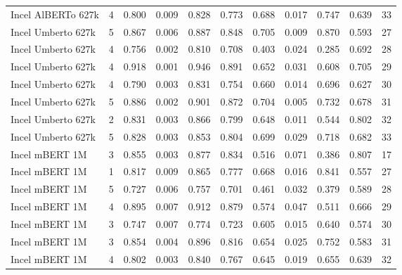 \begin{tabular}{lrrrrrrrrrr}
Incel AlBERTo 627k &      4 &   0.800 &          0.009 &    0.828 &     0.773 &    0.688 &           0.017 &     0.747 &      0.639 &  33 \\
Incel Umberto 627k &      5 &   0.867 &          0.006 &    0.887 &     0.848 &    0.705 &           0.009 &     0.870 &      0.593 &  27 \\
Incel Umberto 627k &      4 &   0.756 &          0.002 &    0.810 &     0.708 &    0.403 &           0.024 &     0.285 &      0.692 &  28 \\
Incel Umberto 627k &      4 &   0.918 &          0.001 &    0.946 &     0.891 &    0.652 &           0.031 &     0.608 &      0.705 &  29 \\
Incel Umberto 627k &      4 &   0.790 &          0.003 &    0.831 &     0.754 &    0.660 &           0.014 &     0.696 &      0.627 &  30 \\
Incel Umberto 627k &      5 &   0.886 &          0.002 &    0.901 &     0.872 &    0.704 &           0.005 &     0.732 &      0.678 &  31 \\
Incel Umberto 627k &      2 &   0.831 &          0.003 &    0.866 &     0.799 &    0.648 &           0.011 &     0.544 &      0.802 &  32 \\
Incel Umberto 627k &      5 &   0.828 &          0.003 &    0.853 &     0.804 &    0.699 &           0.029 &     0.718 &      0.682 &  33 \\
    Incel mBERT 1M &      3 &   0.855 &          0.003 &    0.877 &     0.834 &    0.516 &           0.071 &     0.386 &      0.807 &  17 \\
    Incel mBERT 1M &      1 &   0.817 &          0.009 &    0.865 &     0.777 &    0.668 &           0.016 &     0.841 &      0.557 &  27 \\
    Incel mBERT 1M &      5 &   0.727 &          0.006 &    0.757 &     0.701 &    0.461 &           0.032 &     0.379 &      0.589 &  28 \\
    Incel mBERT 1M &      4 &   0.895 &          0.007 &    0.912 &     0.879 &    0.574 &           0.047 &     0.511 &      0.666 &  29 \\
    Incel mBERT 1M &      3 &   0.747 &          0.007 &    0.774 &     0.723 &    0.605 &           0.015 &     0.640 &      0.574 &  30 \\
    Incel mBERT 1M &      3 &   0.854 &          0.004 &    0.896 &     0.816 &    0.654 &           0.025 &     0.752 &      0.583 &  31 \\
    Incel mBERT 1M &      4 &   0.802 &          0.003 &    0.840 &     0.767 &    0.645 &           0.019 &     0.655 &      0.639 &  32 \\

\end{tabular}
